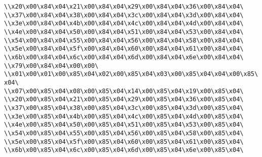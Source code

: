 \verb|\\x20\x00\x84\x04\x21\x00\x84\x04\x29\x00\x84\x04\x36\x00\x84\x04\|\newline
\verb|\\x37\x00\x84\x04\x38\x00\x84\x04\x3c\x00\x84\x04\x3d\x00\x84\x04\|\newline
\verb|\\x3e\x00\x84\x04\x4b\x00\x84\x04\x4c\x00\x84\x04\x4d\x00\x84\x04\|\newline
\verb|\\x4e\x00\x84\x04\x50\x00\x84\x04\x51\x00\x84\x04\x53\x00\x84\x04\|\newline
\verb|\\x54\x00\x84\x04\x55\x00\x84\x04\x56\x00\x84\x04\x58\x00\x84\x04\|\newline
\verb|\\x5e\x00\x84\x04\x5f\x00\x84\x04\x60\x00\x84\x04\x61\x00\x84\x04\|\newline
\verb|\\x6b\x00\x84\x04\x6c\x00\x84\x04\x6d\x00\x84\x04\x6e\x00\x84\x04\|\newline
\verb|\\x79\x00\x84\x04\x00\x00\|\newline
\verb|\\x01\x00\x01\x00\x85\x04\x02\x00\x85\x04\x03\x00\x85\x04\x04\x00\x85\x04\|\newline
\verb|\\x07\x00\x85\x04\x08\x00\x85\x04\x14\x00\x85\x04\x19\x00\x85\x04\|\newline
\verb|\\x20\x00\x85\x04\x21\x00\x85\x04\x29\x00\x85\x04\x36\x00\x85\x04\|\newline
\verb|\\x37\x00\x85\x04\x38\x00\x85\x04\x3c\x00\x85\x04\x3d\x00\x85\x04\|\newline
\verb|\\x3e\x00\x85\x04\x4b\x00\x85\x04\x4c\x00\x85\x04\x4d\x00\x85\x04\|\newline
\verb|\\x4e\x00\x85\x04\x50\x00\x85\x04\x51\x00\x85\x04\x53\x00\x85\x04\|\newline
\verb|\\x54\x00\x85\x04\x55\x00\x85\x04\x56\x00\x85\x04\x58\x00\x85\x04\|\newline
\verb|\\x5e\x00\x85\x04\x5f\x00\x85\x04\x60\x00\x85\x04\x61\x00\x85\x04\|\newline
\verb|\\x6b\x00\x85\x04\x6c\x00\x85\x04\x6d\x00\x85\x04\x6e\x00\x85\x04\|\newline
